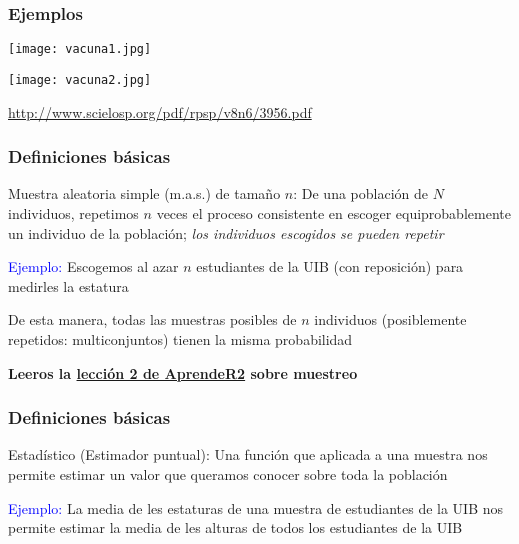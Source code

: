 \documentclass[12pt,t]{beamer}\usepackage[]{graphicx}\usepackage[]{color}
\newcommand{\blue}[1]{\textcolor{blue}{#1}}
\renewcommand{\emph}[1]{{\color{red}#1}}
\theoremstyle{plain}
\theoremstyle{definition}
\begin{document}
%
%

\begin{frame}
\frametitle{Ejemplos}


\begin{center}
\texttt{[image: vacuna1.jpg]}\medskip

\texttt{[image: vacuna2.jpg]}
\end{center}


{\footnotesize \url{http://www.scielosp.org/pdf/rpsp/v8n6/3956.pdf}}
\end{frame}

\begin{frame}
\frametitle{Definiciones básicas}

\emph{Muestra aleatoria simple (m.a.s.) de tamaño $n$:} De una población de $N$ individuos, repetimos $n$ veces el proceso   consistente en escoger equiprobablemente un individuo de la población; \textit{los individuos escogidos se pueden repetir}
\bigskip

\blue{Ejemplo:} Escogemos  al azar $n$ estudiantes de la UIB (con reposición) para medirles la estatura
\bigskip

De esta manera, todas las muestras posibles de $n$ individuos (posiblemente repetidos: \emph{multiconjuntos}) tienen la misma probabilidad
\bigskip

\emph{\bf Leeros la \href{https://aprender-uib.github.io/AprendeR2/chap-muestreo.html}{lección 2 de AprendeR2} sobre muestreo}
\end{frame}


\begin{frame}
\frametitle{Definiciones básicas}

\emph{Estadístico} (\emph{Estimador puntual}): Una función que aplicada a una muestra nos permite \emph{estimar} un valor que queramos conocer sobre  toda la población
\bigskip

\blue{Ejemplo:} La media de les estaturas  de una muestra de estudiantes de la UIB nos permite estimar la media de les alturas de todos los   estudiantes de la UIB
\bigskip

\end{frame}
\end{document}
